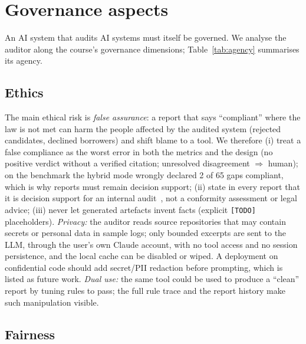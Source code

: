 \chapter{Governance aspects}
\label{chapter:governance}

An AI system that audits AI systems must itself be governed. We analyse the auditor along the course's governance
dimensions; Table~\ref{tab:agency} summarises its agency.

\section{Ethics}
\label{section:ethics}

The main ethical risk is \emph{false assurance}: a report that says ``compliant'' where the law is not met can harm the
people affected by the audited system (rejected candidates, declined borrowers) and shift blame to a tool. We therefore
(i) treat a false compliance as the worst error in both the metrics and the design (no positive verdict without a
verified citation; unresolved disagreement $\Rightarrow$ human); on the benchmark the
hybrid mode wrongly declared 2 of 65 gaps compliant, which is why reports must remain decision support; (ii) state in every report that it is decision support for an
internal audit~\cite{raji2020closing}, not a conformity assessment or legal advice; (iii) never let generated artefacts
invent facts (explicit \texttt{[TODO]} placeholders). \emph{Privacy:} the auditor reads source repositories that may
contain secrets or personal data in sample logs; only bounded excerpts are sent to the LLM, through the user's own Claude
account, with no tool access and no session persistence, and the local cache can be disabled or wiped. A deployment on
confidential code should add secret/PII redaction before prompting, which is listed as future work. \emph{Dual use:} the
same tool could be used to produce a ``clean'' report by tuning rules to pass; the full rule trace and the report history
make such manipulation visible.

\section{Fairness}
\label{section:fairness}

